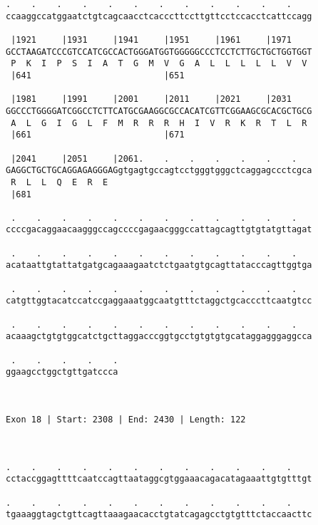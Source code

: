 \documentclass{article}
\begin{document}
\begin{Verbatim}
.    .    .    .    .    .    .    .    .    .    .    .    
ccaaggccatggaatctgtcagcaacctcacccttccttgttcctccacctcattccagg
                                                            
 |1921     |1931     |1941     |1951     |1961     |1971    
GCCTAAGATCCCGTCCATCGCCACTGGGATGGTGGGGGCCCTCCTCTTGCTGCTGGTGGT
 P  K  I  P  S  I  A  T  G  M  V  G  A  L  L  L  L  L  V  V 
 |641                          |651                         
  
 |1981     |1991     |2001     |2011     |2021     |2031    
GGCCCTGGGGATCGGCCTCTTCATGCGAAGGCGCCACATCGTTCGGAAGCGCACGCTGCG
 A  L  G  I  G  L  F  M  R  R  R  H  I  V  R  K  R  T  L  R 
 |661                          |671                         
  
 |2041     |2051     |2061.    .    .    .    .    .    .   
GAGGCTGCTGCAGGAGAGGGAGgtgagtgccagtcctgggtgggctcaggagccctcgca
 R  L  L  Q  E  R  E                                        
 |681                                                       
  
 .    .    .    .    .    .    .    .    .    .    .    .   
ccccgacaggaacaagggccagccccgagaacgggccattagcagttgtgtatgttagat
                                                            
 .    .    .    .    .    .    .    .    .    .    .    .   
acataattgtattatgatgcagaaagaatctctgaatgtgcagttatacccagttggtga
                                                            
 .    .    .    .    .    .    .    .    .    .    .    .   
catgttggtacatccatccgaggaaatggcaatgtttctaggctgcacccttcaatgtcc
                                                            
 .    .    .    .    .    .    .    .    .    .    .    .   
acaaagctgtgtggcatctgcttaggacccggtgcctgtgtgtgcataggagggaggcca
                                                            
 .    .    .    .    .
ggaagcctggctgttgatccca
                      
                      
 
Exon 18 | Start: 2308 | End: 2430 | Length: 122



.    .    .    .    .    .    .    .    .    .    .    .    
cctaccggagttttcaatccagttaataggcgtggaaacagacatagaaattgtgtttgt
                                                            
.    .    .    .    .    .    .    .    .    .    .    .    
tgaaaggtagctgttcagttaaagaacacctgtatcagagcctgtgtttctaccaacttc
                                                            

\end{Verbatim}
\end{document}
